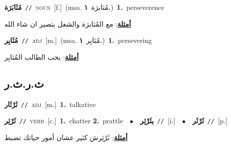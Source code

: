 \documentclass[10pt,a4paper,twoside]{article} %
\begin{document}
\begin{multicols}{2}
{{\setlength\topsep{0pt}\textbf{\foreignlanguage{arabic}{مُثَابَرَة}}\ {\color{gray}\texttt{//}\color{black}}\ \textsc{noun}\ [f.]\ \color{gray}(msa. \foreignlanguage{arabic}{مُثابرَة}~\foreignlanguage{arabic}{\textbf{١.}})\color{black}\ \textbf{1.}~perseverence\  \begin{flushright}\color{gray}\foreignlanguage{arabic}{\textbf{\underline{\foreignlanguage{arabic}{أمثلة}}}: مع المُثابرَة والشغل بتصير ان شاء الله}\end{flushright}\color{black}} \vspace{2mm}

{\setlength\topsep{0pt}\textbf{\foreignlanguage{arabic}{مُثَابِر}}\ {\color{gray}\texttt{//}\color{black}}\ \textsc{adj}\ [m.]\ \color{gray}(msa. \foreignlanguage{arabic}{مُثابِر}~\foreignlanguage{arabic}{\textbf{١.}})\color{black}\ \textbf{1.}~persevering\  \begin{flushright}\color{gray}\foreignlanguage{arabic}{\textbf{\underline{\foreignlanguage{arabic}{أمثلة}}}: بحب الطالب المُثابِر}\end{flushright}\color{black}} \vspace{2mm}

\vspace{-3mm}
\subsection*{\color{blue}\foreignlanguage{arabic}{ث.ر.ث.ر}\color{blue}{}} 

{\setlength\topsep{0pt}\textbf{\foreignlanguage{arabic}{ثَرْثَار}}\ {\color{gray}\texttt{//}\color{black}}\ \textsc{adj}\ [m.]\ \textbf{1.}~talkative\ 

{\setlength\topsep{0pt}\textbf{\foreignlanguage{arabic}{ثَرْثِر}}\ {\color{gray}\texttt{//}\color{black}}\ \textsc{verb}\ [c.]\ \textbf{1.}~chatter  \textbf{2.}~prattle\ \ $\bullet$\ \ \setlength\topsep{0pt}\textbf{\foreignlanguage{arabic}{يثَرْثِر}}\ {\color{gray}\texttt{//}\color{black}}\ [i.]\ \ $\bullet$\ \ \setlength\topsep{0pt}\textbf{\foreignlanguage{arabic}{ثَرْثَر}}\ {\color{gray}\texttt{//}\color{black}}\ [p.]\  \begin{flushright}\color{gray}\foreignlanguage{arabic}{\textbf{\underline{\foreignlanguage{arabic}{أمثلة}}}: ثَرْثِرش كثير عشان أمور حياتك تضبط}\end{flushright}\color{black}} \vspace{2mm}

}}
\end{multicols}
\end{document}
